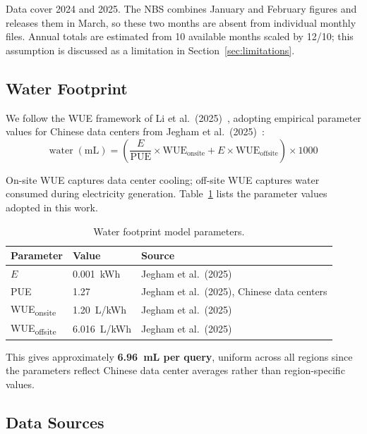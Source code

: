 \documentclass[11pt,a4paper]{article}
\begin{document}
Data cover 2024 and 2025. The NBS combines January and February figures and
releases them in March, so these two months are absent from individual
monthly files. Annual totals are estimated from 10 available months scaled
by 12/10; this assumption is discussed as a limitation in
Section~\ref{sec:limitations}.

\subsection{Water Footprint}

We follow the WUE framework of Li et al.\ (2025)~\cite{li2025}, adopting
empirical parameter values for Chinese data centers from Jegham et al.\ (2025)~\cite{jegham2025}:
\begin{equation}
  \text{water} \; (\text{mL}) =
  \left(\frac{E}{\text{PUE}} \times \text{WUE}_{\text{onsite}}
   + E \times \text{WUE}_{\text{offsite}}\right) \times 1000
\end{equation}

On-site WUE captures data center cooling; off-site WUE captures water
consumed during electricity generation. Table~\ref{tab:water_params} lists the
parameter values adopted in this work.

\begin{table}[h]
\centering
\renewcommand{\arraystretch}{1.2}
\begin{tabular}{lll}
\toprule
Parameter & Value & Source \\
\midrule
$E$ & 0.001~kWh & Jegham et al.\ (2025) \\
PUE & 1.27 & Jegham et al.\ (2025), Chinese data centers \\
WUE\textsubscript{onsite}  & 1.20~L/kWh & Jegham et al.\ (2025) \\
WUE\textsubscript{offsite} & 6.016~L/kWh & Jegham et al.\ (2025) \\
\bottomrule
\end{tabular}
\vspace{4pt}
\caption{Water footprint model parameters.}
\label{tab:water_params}
\end{table}

This gives approximately \textbf{6.96~mL per query}, uniform across all
regions since the parameters reflect Chinese data center averages rather
than region-specific values.

\subsection{Data Sources}
\end{document}
